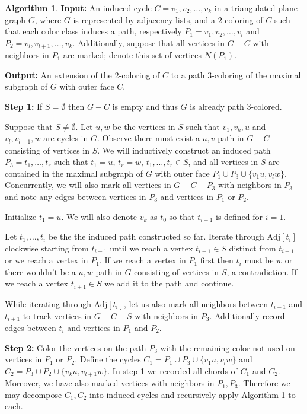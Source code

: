 \documentclass[12pt,letterpaper]{article}
\theoremstyle{plain}
\theoremstyle{definition}
\theoremstyle{break}
\newtheorem{algorithm}[lemma]{Algorithm}     %
\begin{document}
\begin{algorithm}\label{A:poh_linear}
\textbf{Input:} An induced cycle $C=v_1,v_2,\ldots,v_k$ in a triangulated plane
graph $G$, where $G$ is represented by adjacency lists, and a $2$-coloring of $C$ such
that each color class induces a path, respectively $P_1=v_1,v_2,\ldots,v_l$ and
$P_2=v_l,v_{l+1},\ldots,v_k$. Additionally, suppose that all vertices in $G-C$
with neighbors in $P_1$ are marked; denote this set of vertices
$N(P_1)$.

\noindent\textbf{Output:} An extension of the $2$-coloring of $C$ to a path
$3$-coloring of the maximal subgraph of $G$ with outer face $C$.

\noindent\textbf{Step 1:} If $S=\emptyset$ then $G-C$ is empty and thus $G$ is
already path $3$-colored.
    
Suppose that $S\ne\emptyset$. Let $u,w$ be the vertices in $S$ such that $v_1, v_k, u$
and $v_l,v_{l+1}, w$ are
cycles in $G$. Observe there must exist a $u,v$-path in $G-C$ consisting of
vertices in $S$. We will inductively construct
an induced path $P_3=t_1,\ldots,t_r$ such that $t_1=u$, $t_r=w$, $t_1,\ldots,t_r\in
S$, and all vertices in $S$ are contained in the maximal subgraph of $G$ with
outer face $P_1\cup P_3\cup \{v_1u,v_lw\}$. Concurrently, we will
also mark all vertices in $G-C-P_3$ with neighbors in $P_3$ and note any
edges between vertices in $P_3$ and vertices in $P_1$ or $P_2$.

Initialize $t_1=u$. We will also denote $v_k$ as $t_0$ so that
$t_{i-1}$ is defined for $i=1$.

Let $t_1,\ldots,t_i$ be the the induced path constructed so far. Iterate
through $\text{Adj}[t_i]$ clockwise starting from $t_{i-1}$ until we reach a
vertex $t_{i+1}\in S$ distinct from $t_{i-1}$ or we reach a vertex in $P_1$. If
we reach a vertex in $P_1$ first then $t_i$ must be $w$ or there wouldn't be a
$u,w$-path in $G$ consisting of vertices in $S$, a contradiction. If we reach a
vertex $t_{i+1}\in S$ we add it to the path and continue.
    
While iterating
through $\text{Adj}[t_i]$, let us also mark all neighbors between $t_{i-1}$ and
$t_{i+1}$ to track vertices in $G-C-S$ with neighbors in $P_3$. Additionally record
edges between $t_i$ and vertices in $P_1$ and $P_2$.

\noindent\textbf{Step 2:} Color the vertices on the path $P_3$ with the
remaining color not used on vertices in $P_1$ or $P_2$. Define the cycles
$C_1=P_1\cup P_3\cup\{v_1u,v_lw\}$ and $C_2=P_3\cup
P_2\cup\{v_ku,v_{l+1}w\}$. In step 1 we recorded all chords of $C_1$ and
$C_2$. Moreover, we have also marked vertices with neighbors in $P_1,P_3$.
Therefore we may decompose $C_1,C_2$ into induced cycles and recursively apply
Algorithm \ref{A:poh_linear} to each.
\end{algorithm}
\end{document}

